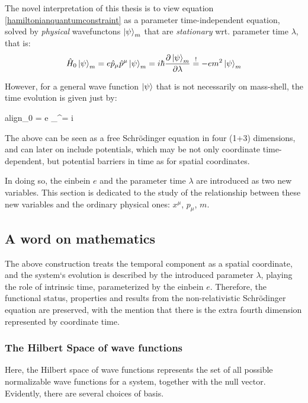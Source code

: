 \documentclass[a4paper,10pt]{article}
\numberwithin{equation}{section}
\newcommand{\boxedeq}[2]{\begin{empheq}[box={\fboxsep=6pt\fbox}]{align}\label{#1}#2\end{empheq}}
\begin{document}
The novel interpretation of this thesis is to view equation \ref{hamiltonianquantumconstraint} as a parameter time-independent equation, solved by \textit{physical} wavefunctons $\ket{\psi}_m$ that are \textit{stationary} wrt. parameter time $\lambda$, that is:
\begin{equation}
    \hat{H}_0 \ket{\psi}_{m} = e \hat{p}_\mu \hat{p}^\mu \ket{\psi}_{m}=  i\hbar \dfrac{\partial \ket{\psi}_{m}}{\partial \lambda} \stackrel{!}{=}   -e m^2 \ket{\psi}_{m}
    \label{parameternergyeigenvalueeqn}
\end{equation}

However, for a general wave function $\ket{\psi}$ that is not necessarily on mass-shell, the time evolution is given just by:

\boxedeq{eq:timeevolution}{_0 \ket{\psi} = e _\mu \hat{p}^\mu \ket{\psi}=   i\hbar \dfrac{\partial \ket{\psi}}{\partial \lambda}}

The above can be seen as a free Schr{\"o}dinger equation in four (1+3) dimensions, and can later on include potentials, which may be not only coordinate time-dependent, but potential barriers in time as for spatial coordinates.


In doing so, the einbein $e$ and the parameter time $\lambda$ are introduced as two new variables. This section is dedicated to the  study of the relationship between these new variables and the ordinary physical ones:  $x^\mu$, $p_\mu$, $m$.

\subsection{A word on mathematics}
The above construction treats the temporal component as a spatial coordinate, and the system`s evolution is described by the introduced parameter $\lambda$, playing the role of intrinsic time, parameterized by the einbein $e$. Therefore, the functional status, properties and results from the non-relativistic Schr{\"o}dinger equation are preserved, with the mention that there is the extra fourth dimension represented by coordinate time.

\subsubsection{The Hilbert Space of wave functions}
Here, the Hilbert space of wave functions represents the set of all possible normalizable wave functions for a system, together with the null vector. Evidently,  there are several choices of basis.
\end{document}
